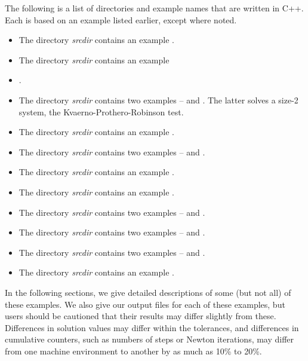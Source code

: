 The following is a list of directories and example names that
are written in C++.  Each is based on an example listed earlier,
except where noted.

\begin{itemize}
\item The directory {\em srcdir}
  contains an example .
\item The directory {\em srcdir}
  contains an example \item {}.
\item The directory {\em srcdir}
  contains two examples --  and .  The latter
  solves a size-2 system, the Kvaerno-Prothero-Robinson test.
\item The directory {\em srcdir}
contains an example .
\item The directory {\em srcdir}
  contains two examples --  and
  .
\item The directory {\em srcdir}
  contains an example .
\item The directory {\em srcdir}
  contains an example .
\item The directory {\em srcdir}
  contains two examples --  and
  .
\item The directory {\em srcdir}
  contains two examples --  and
  .
\item The directory {\em srcdir}
  contains two examples --  and
  .
\item The directory {\em srcdir}
contains an example .

\end{itemize}

\vspace{0.2in}\noindent
In the following sections, we give detailed descriptions of some (but
not all) of these examples.  We also give our output files for
each of these examples, but users should be cautioned that their
results may differ slightly from these.  Differences in solution
values may differ within the tolerances, and differences in cumulative
counters, such as numbers of steps or Newton iterations, may differ
from one machine environment to another by as much as 10\% to 20\%.

